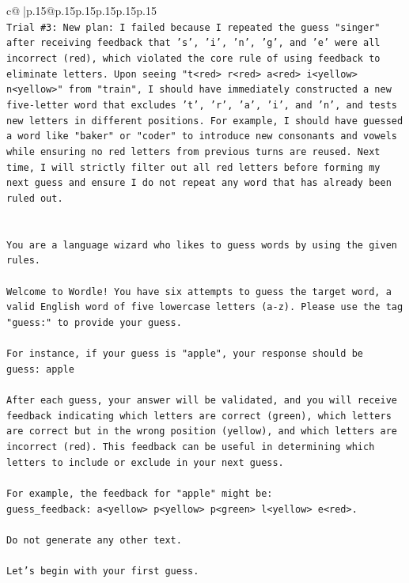 \documentclass{article}
\begin{document}
{\begin{supertabular}{c@{$\;$}|p{.15\linewidth}@{}p{.15\linewidth}p{.15\linewidth}p{.15\linewidth}p{.15\linewidth}p{.15\linewidth}}
{{{\\ 
\texttt{Trial \#3: New plan: I failed because I repeated the guess "singer" after receiving feedback that 's', 'i', 'n', 'g', and 'e' were all incorrect (red), which violated the core rule of using feedback to eliminate letters. Upon seeing "t<red> r<red> a<red> i<yellow> n<yellow>" from "train", I should have immediately constructed a new five{-}letter word that excludes 't', 'r', 'a', 'i', and 'n', and tests new letters in different positions. For example, I should have guessed a word like "baker" or "coder" to introduce new consonants and vowels while ensuring no red letters from previous turns are reused. Next time, I will strictly filter out all red letters before forming my next guess and ensure I do not repeat any word that has already been ruled out.} \\
\\ 
\\ 
\texttt{You are a language wizard who likes to guess words by using the given rules.} \\
\\ 
\texttt{Welcome to Wordle! You have six attempts to guess the target word, a valid English word of five lowercase letters (a{-}z). Please use the tag "guess:" to provide your guess.} \\
\\ 
\texttt{For instance, if your guess is "apple", your response should be} \\
\texttt{guess: apple} \\
\\ 
\texttt{After each guess, your answer will be validated, and you will receive feedback indicating which letters are correct (green), which letters are correct but in the wrong position (yellow), and which letters are incorrect (red). This feedback can be useful in determining which letters to include or exclude in your next guess.} \\
\\ 
\texttt{For example, the feedback for "apple" might be:} \\
\texttt{guess\_feedback: a<yellow> p<yellow> p<green> l<yellow> e<red>.} \\
\\ 
\texttt{Do not generate any other text.} \\
\\ 
\texttt{Let's begin with your first guess.} \\
            }
        }
    }
     \\ \\


\end{supertabular}}
\end{document}
